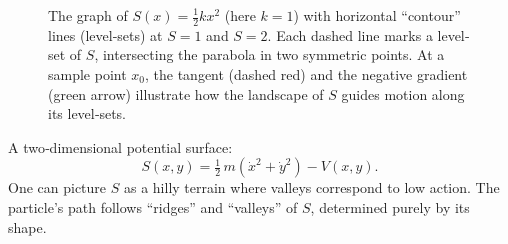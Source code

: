   \begin{figure}[H]
    \centering
    \caption{%
    The graph of $S(x)=\tfrac12kx^2$ (here $k=1$) with horizontal “contour” lines (level‐sets) at $S=1$ and $S=2$.  
    Each dashed line marks a level‐set of $S$, intersecting the parabola in two symmetric points.  
    At a sample point $x_0$, the tangent (dashed red) and the negative gradient (green arrow) illustrate how the landscape of $S$ guides motion along its level‐sets.}
  \end{figure}
    




  A two‐dimensional potential surface:
  \[
    S(x,y) = \tfrac12\,m(\dot x^2 + \dot y^2) - V(x,y).
  \]
  One can picture \(S\) as a hilly terrain where valleys correspond to low action.  The particle’s path follows “ridges” and “valleys” of \(S\), determined purely by its shape.

